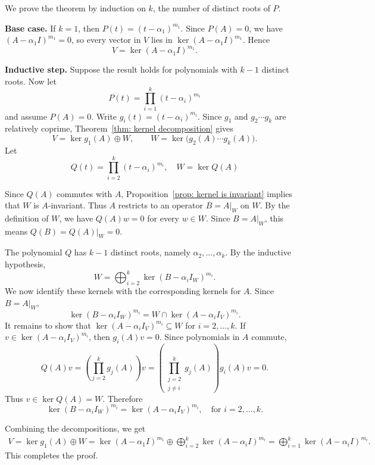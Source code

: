 \begin{proofenv}
    We prove the theorem by induction on $k$, the number of distinct roots of $P$.

    \textbf{Base case.} If $k=1$, then $P(t)=(t-\alpha_1)^{m_1}$. Since $P(A)=0$, we have $(A-\alpha_1 I)^{m_1}=0$, so every vector in $V$ lies in $\ker(A-\alpha_1 I)^{m_1}$. Hence
    $$
    V=\ker(A-\alpha_1 I)^{m_1}.
    $$

    \textbf{Inductive step.} Suppose the result holds for polynomials with $k-1$ distinct roots. Now let
    $$
    P(t)=\prod_{i=1}^k(t-\alpha_i)^{m_i}
    $$
    and assume $P(A)=0$. Write $g_i(t)=(t-\alpha_i)^{m_i}$. Since $g_1$ and $g_2\cdots g_k$ are relatively coprime, Theorem~\ref{thm: kernel decomposition} gives
    $$
    V=\ker g_1(A)\oplus W,
    \qquad
    W=\ker\bigl(g_2(A)\cdots g_k(A)\bigr).
    $$
    Let $$Q(t)=\prod_{i=2}^k(t-\alpha_i)^{m_i}, \quad W=\ker Q(A)$$

    Since $Q(A)$ commutes with $A$, Proposition~\ref{prop: kernel is invariant} implies that $W$ is $A$-invariant. Thus $A$ restricts to an operator $B=A|_W$ on $W$. By the definition of $W$, we have $Q(A)w=0$ for every $w\in W$. Since $B=A|_W$, this means $Q(B)=Q(A)|_W=0$.

    The polynomial $Q$ has $k-1$ distinct roots, namely $\alpha_2,\ldots,\alpha_k$. By the inductive hypothesis,
    $$
    W=\bigoplus_{i=2}^k \ker(B-\alpha_i I_W)^{m_i}.
    $$
    We now identify these kernels with the corresponding kernels for $A$. Since $B=A|_W$,
    $$
    \ker(B-\alpha_i I_W)^{m_i}
    =
    W\cap\ker(A-\alpha_i I_V)^{m_i}.
    $$
    It remains to show that $\ker(A-\alpha_i I_V)^{m_i}\subseteq W$ for $i=2,\ldots,k$. If $v\in\ker(A-\alpha_i I_V)^{m_i}$, then $g_i(A)v=0$. Since polynomials in $A$ commute,
    $$
    Q(A)v
    =
    \left(\prod_{j=2}^k g_j(A)\right)v
    =
    \left(\prod_{\substack{j=2\\ j\neq i}}^k g_j(A)\right)g_i(A)v
    =
    0.
    $$
    Thus $v\in\ker Q(A)=W$. Therefore
    $$
    \ker(B-\alpha_i I_W)^{m_i}
    =
    \ker(A-\alpha_i I_V)^{m_i},\quad \text{for } i=2,\ldots,k.
    $$

    Combining the decompositions, we get
    $$
    \begin{aligned}
    V
    =\ker g_1(A)\oplus W
    =\ker(A-\alpha_1 I)^{m_1}
    \oplus
    \bigoplus_{i=2}^k \ker(A-\alpha_i I)^{m_i}
    =\bigoplus_{i=1}^k \ker(A-\alpha_i I)^{m_i}.
    \end{aligned}
    $$
    This completes the proof.
\end{proofenv}
